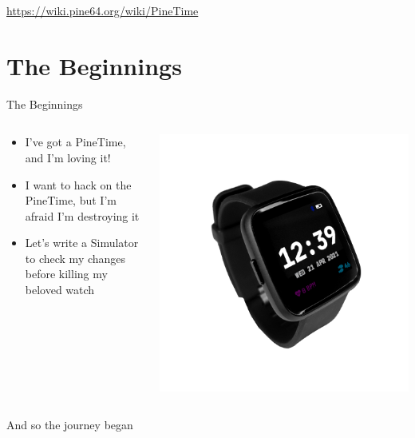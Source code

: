 \documentclass{beamer}
\begin{document}
\begin{frame}{}
\begin{columns}
\begin{column}{0.5\textwidth}
  \end{column}
  \end{columns}

  \medskip

  \small
  \href{https://wiki.pine64.org/wiki/PineTime}{https://wiki.pine64.org/wiki/PineTime}
\end{frame}

\section{The Beginnings}
\begin{frame}{The Beginnings}
  \begin{columns}
  \begin{column}{0.6\textwidth}
    \begin{itemize}
      \item I've got a PineTime, and I'm loving it!
      \item I want to hack on the PineTime, but I'm afraid I'm destroying it
      \item Let's write a Simulator to check my changes before killing my beloved watch
    \end{itemize}
  \end{column}
  \begin{column}{0.5\textwidth}
    \includegraphics[width=\textwidth]{../pinetime-slider-v2}
  \end{column}
  \end{columns}

  And so the journey began
\end{frame}
\end{document}

